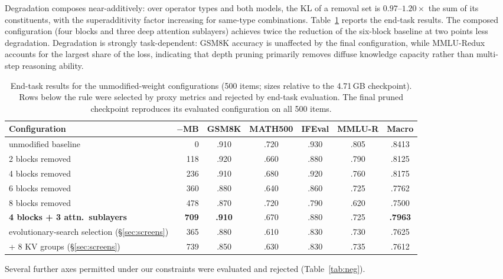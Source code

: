 \documentclass[10pt]{article}
\begin{document}
Degradation composes near-additively: over operator types and both models, the KL of a removal set is $0.97$--$1.20\times$ the sum of its constituents, with the superadditivity factor increasing for same-type combinations. Table~\ref{tab:main} reports the end-task results. The composed configuration (four blocks and three deep attention sublayers) achieves twice the reduction of the six-block baseline at two points less degradation. Degradation is strongly task-dependent: GSM8K accuracy is unaffected by the final configuration, while MMLU-Redux accounts for the largest share of the loss, indicating that depth pruning primarily removes diffuse knowledge capacity rather than multi-step reasoning ability.

\begin{table}[h]
\centering\small
\begin{tabular}{lrccccc}
\toprule
Configuration & $-$MB & GSM8K & MATH500 & IFEval & MMLU-R & Macro \\
\midrule
unmodified baseline & 0 & .910 & .720 & .930 & .805 & .8413 \\
2 blocks removed & 118 & .920 & .660 & .880 & .790 & .8125 \\
4 blocks removed & 236 & .910 & .680 & .920 & .760 & .8175 \\
6 blocks removed & 360 & .880 & .640 & .860 & .725 & .7762 \\
8 blocks removed & 478 & .870 & .720 & .790 & .620 & .7500 \\
\textbf{4 blocks + 3 attn.\ sublayers} & \textbf{709} & \textbf{.910} & .670 & .880 & .725 & \textbf{.7963} \\
\midrule
evolutionary-search selection (\S\ref{sec:screens}) & 365 & .880 & .610 & .830 & .730 & .7625 \\
+ 8 KV groups (\S\ref{sec:screens}) & 739 & .850 & .630 & .830 & .735 & .7612 \\
\bottomrule
\end{tabular}
\caption{End-task results for the unmodified-weight configurations (500 items; sizes relative to the 4.71\,GB checkpoint). Rows below the rule were selected by proxy metrics and rejected by end-task evaluation. The final pruned checkpoint reproduces its evaluated configuration on all 500 items.}
\label{tab:main}
\end{table}

Several further axes permitted under our constraints were evaluated and rejected (Table~\ref{tab:neg}).
\end{document}
